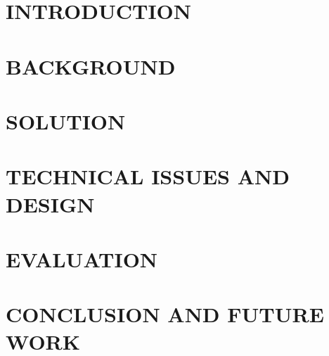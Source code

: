 \documentclass[a4paper,13pt,3p,twoside]{report}
\renewcommand{\bibname}{reference}
\theoremstyle{definition}
\begin{document}
\renewcommand{\listtablename}{LIST OF TABLES}
{\let\oldnumberline\numberline
\renewcommand{\numberline}{Bảng~\oldnumberline}
\listoftables}
\glsaddall 


\renewcommand*{\acronymname}{ACRONYMS}
\printnoidxglossaries


\newpage
{}

\pagestyle{fancy}
\fancyhf{}
\fancyhead[RE, LO]{\leftmark}
\fancyfoot[RE, LO]{\thepage}

\chapter{INTRODUCTION}
\label{chapter:Introduction}

\newpage
\chapter{BACKGROUND}
\label{chapter:Background}


\newpage
\chapter{SOLUTION}
\label{chapter:Solution}


\newpage
\chapter{TECHNICAL ISSUES AND DESIGN}
\label{chapter:Technical_issues_and_design}


\newpage
\chapter{EVALUATION}
\label{chapter:Evaluation}

\newpage
\chapter{CONCLUSION AND FUTURE WORK} %
\label{chapter:conclusion}


\newpage
\renewcommand\bibname{REFERENCE}
\printbibliography
{}
\end{document}
